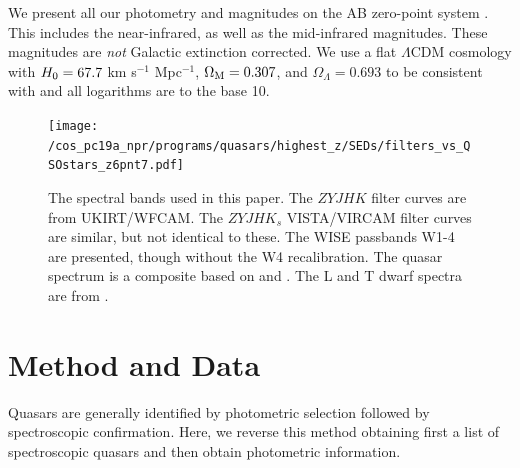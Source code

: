 \documentclass[usenatbib]{mnras}
\begin{document}
We present all our photometry and magnitudes on the AB zero-point
system \citep{Oke_Gunn1983, Fukugita1996}.  This includes the
near-infrared, as well as the mid-infrared magnitudes. These
magnitudes are {\it not} Galactic extinction corrected. We use a flat
$\Lambda$CDM cosmology with $H_{\rm 0} = 67.7$ km s$^{-1}$ Mpc$^{-1}$,
$\Omega_{\rm M} = 0.307$, and $\Omega_{\Lambda} = 0.693$
\citet{Planck2016} to be consistent with \citet{Banados2016} and all
logarithms are to the base 10.


\begin{figure}
  \texttt{[image: /cos\_pc19a\_npr/programs/quasars/highest\_z/SEDs/filters\_vs\_QSOstars\_z6pnt7.pdf]}
  \centering
  \vspace{-12pt}
  \caption[]
  {The spectral bands used in this paper. 
    The $ZYJHK$ filter curves are from UKIRT/WFCAM.  
    The $ZYJHK_{s}$ VISTA/VIRCAM filter curves are similar, but not identical to these. 
    The WISE passbands W1-4 are presented, though without the \citet{Brown2014b} W4 recalibration. 
    The quasar spectrum is a composite based on \citet{VdB2001} and 
    \citet{Banados2016}. The L and T dwarf spectra are from \citet{Cushing2006}. }
  \label{fig:filters}
\end{figure}

\vspace{-16pt}
\section{Method and Data}
Quasars are generally identified by photometric selection followed by
spectroscopic confirmation. Here, we reverse this method obtaining
first a list of spectroscopic quasars and then obtain photometric
information.
\end{document}
